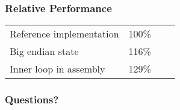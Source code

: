 \documentclass[17pt]{beamer}
\begin{document}
\begin{frame}
    \frametitle{Relative Performance}
    \begin{center}
        \begin{tabular}{l c c c}
            Reference implementation & 100\% \\
            Big endian state & 116\% \\
            Inner loop in assembly & 129\% \\
        \end{tabular}
    \end{center}
\end{frame}

\begin{frame}
    \frametitle{Questions?}
\end{frame}
\end{document}
